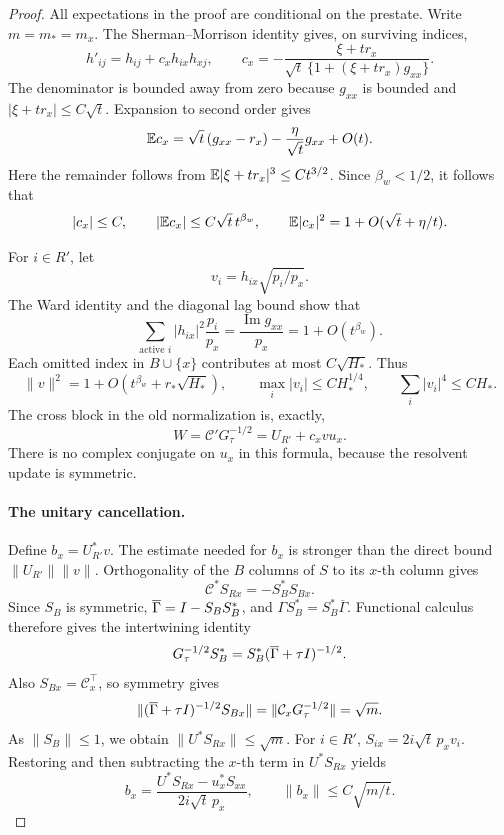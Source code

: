 \begin{proof}
All expectations in the proof are conditional on the prestate.  Write
\(m=m_*=m_x\).  The Sherman--Morrison identity gives, on surviving indices,
\begin{equation}\label{eq:clearing-heat-update}
 h'_{ij}=h_{ij}+c_xh_{ix}h_{xj},\qquad
 c_x=-\frac{\xi+tr_x}
 {\sqrt t\,\{1+(\xi+tr_x)g_{xx}\}}.
\end{equation}
The denominator is bounded away from zero because \(g_{xx}\) is bounded
and \(|\xi+tr_x|\le C\sqrt t\).  Expansion to second order gives
\[
 \mathbb E c_x
 =\sqrt t\,(g_{xx}-r_x)-\frac{\eta}{\sqrt t}g_{xx}+O(t).
\]
Here the remainder follows from
\(\mathbb E|\xi+tr_x|^3\le Ct^{3/2}\).
Since \(\beta_w<1/2\), it follows that
\begin{equation}\label{eq:clearing-heat-moments}
 |c_x|\le C,\qquad
 |\mathbb E c_x|\le C\sqrt t\,t^{\beta_w},\qquad
 \mathbb E|c_x|^2=1+O(\sqrt t+\eta/t).
\end{equation}

For \(i\in R'\), let
\[
 v_i=h_{ix}\sqrt{p_i/p_x}.
\]
The Ward identity and the diagonal lag bound show that
\[
 \sum_{\text{active }i}|h_{ix}|^2\frac{p_i}{p_x}
 =\frac{\operatorname{Im}g_{xx}}{p_x}
 =1+O(t^{\beta_w}).
\]
Each omitted index in \(B\cup\{x\}\) contributes at most
\(C\sqrt{H_*}\).  Thus
\begin{equation}\label{eq:clearing-v-bounds}
 \|v\|^2=1+O(t^{\beta_w}+r_*\sqrt{H_*}),\qquad
 \max_i|v_i|\le CH_*^{1/4},\qquad
 \sum_i|v_i|^4\le CH_*.
\end{equation}
The cross block in the old normalization is, exactly,
\begin{equation}\label{eq:clearing-cross-update}
 W=\mathcal C'G_\tau^{-1/2}=U_{R'}+c_xvu_x.
\end{equation}
There is no complex conjugate on \(u_x\) in this formula, because the
resolvent update is symmetric.

\paragraph{The unitary cancellation.}
Define \(b_x=U_{R'}^*v\).  The estimate needed for \(b_x\) is stronger
than the direct bound \(\|U_{R'}\|\|v\|\).  Orthogonality of the \(B\)
columns of \(S\) to its \(x\)-th column gives
\[
 \mathcal C^*S_{Rx}=-S_B^*S_{Bx}.
\]
Since \(S_B\) is symmetric,
\(\overline\Gamma=I-S_BS_B^*\), and
\(\Gamma S_B^*=S_B^*\overline\Gamma\).  Functional calculus therefore
gives the intertwining identity
\[
 G_\tau^{-1/2}S_B^*
   =S_B^*(\overline\Gamma+\tau I)^{-1/2}.
\]
Also \(S_{Bx}=\mathcal C_x^\top\), so symmetry gives
\[
 \|(\overline\Gamma+\tau I)^{-1/2}S_{Bx}\|
   =\|\mathcal C_xG_\tau^{-1/2}\|=\sqrt m.
\]
As \(\|S_B\|\le1\), we obtain \(\|U^*S_{Rx}\|\le\sqrt m\).
For \(i\in R'\),
\(S_{ix}=2i\sqrt t\,p_xv_i\).  Restoring and then subtracting the
\(x\)-th term in \(U^*S_{Rx}\) yields
\begin{equation}\label{eq:clearing-b-cancellation}
 b_x=\frac{U^*S_{Rx}-u_x^*S_{xx}}{2i\sqrt t\,p_x},
 \qquad \|b_x\|\le C\sqrt{m/t}.
\end{equation}


\end{proof}
